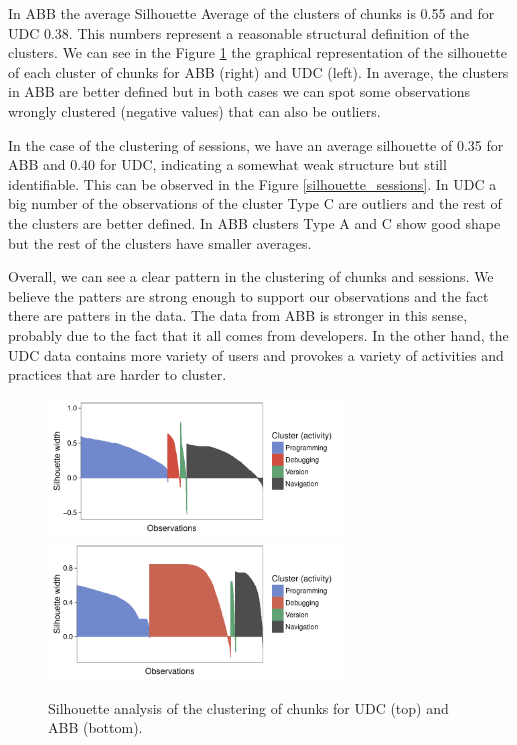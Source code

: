 In ABB the average Silhouette Average of the clusters of chunks is 0.55 and for UDC 0.38. This numbers represent a reasonable structural definition of the clusters. We can see in the Figure \ref{silhouette_chunks} the graphical representation of the silhouette of each cluster of chunks for ABB (right) and UDC (left). In average, the clusters in ABB are better defined but in both cases we can spot some observations wrongly clustered (negative values) that can also be outliers.

In the case of the clustering of sessions, we have an average silhouette of 0.35 for ABB and 0.40 for UDC, indicating a somewhat weak structure but still identifiable. This can be observed in the Figure \ref{silhouette_sessions}. In UDC a big number of the observations of the cluster Type C are outliers and the rest of the clusters are better defined. In ABB clusters Type A and C show good shape but the rest of the clusters have smaller averages.

Overall, we can see a clear pattern in the clustering of chunks and sessions. We believe the patters are strong enough to support our observations and the fact there are patters in the data. The data from ABB is stronger in this sense, probably due to the fact that it all comes from developers. In the other hand, the UDC data contains more variety of users and provokes a variety of activities and practices that are harder to cluster. 



\begin{figure}[!ht]
	\caption{Silhouette analysis of the clustering of chunks for UDC (top) and ABB (bottom).}
	\centering		
	\includegraphics[width=0.7\textwidth]{Figures/UDC_silhouette_chunks}
	\includegraphics[width=0.7\textwidth]{Figures/ABB_silhouette_chunks}	
	\label{silhouette_chunks}
\end{figure}


